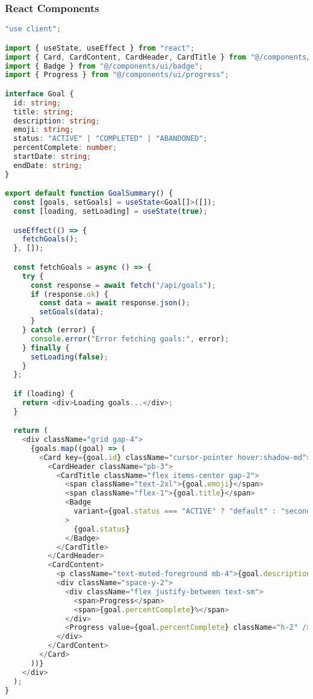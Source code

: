 \subsubsection{React Components}

\begin{lstlisting}[language=TypeScript, caption=app/components/goal-summary.tsx]
"use client";

import { useState, useEffect } from "react";
import { Card, CardContent, CardHeader, CardTitle } from "@/components/ui/card";
import { Badge } from "@/components/ui/badge";
import { Progress } from "@/components/ui/progress";

interface Goal {
  id: string;
  title: string;
  description: string;
  emoji: string;
  status: "ACTIVE" | "COMPLETED" | "ABANDONED";
  percentComplete: number;
  startDate: string;
  endDate: string;
}

export default function GoalSummary() {
  const [goals, setGoals] = useState<Goal[]>([]);
  const [loading, setLoading] = useState(true);

  useEffect(() => {
    fetchGoals();
  }, []);

  const fetchGoals = async () => {
    try {
      const response = await fetch("/api/goals");
      if (response.ok) {
        const data = await response.json();
        setGoals(data);
      }
    } catch (error) {
      console.error("Error fetching goals:", error);
    } finally {
      setLoading(false);
    }
  };

  if (loading) {
    return <div>Loading goals...</div>;
  }

  return (
    <div className="grid gap-4">
      {goals.map((goal) => (
        <Card key={goal.id} className="cursor-pointer hover:shadow-md">
          <CardHeader className="pb-3">
            <CardTitle className="flex items-center gap-2">
              <span className="text-2xl">{goal.emoji}</span>
              <span className="flex-1">{goal.title}</span>
              <Badge 
                variant={goal.status === "ACTIVE" ? "default" : "secondary"}
              >
                {goal.status}
              </Badge>
            </CardTitle>
          </CardHeader>
          <CardContent>
            <p className="text-muted-foreground mb-4">{goal.description}</p>
            <div className="space-y-2">
              <div className="flex justify-between text-sm">
                <span>Progress</span>
                <span>{goal.percentComplete}%</span>
              </div>
              <Progress value={goal.percentComplete} className="h-2" />
            </div>
          </CardContent>
        </Card>
      ))}
    </div>
  );
}
\end{lstlisting}

